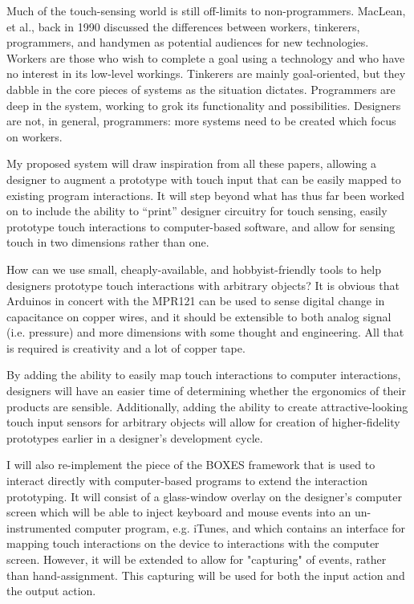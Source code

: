 \documentclass[11pt]{article}
\begin{document}
Much of the touch-sensing world is still off-limits to non-programmers.  MacLean, et al., \cite{USER-TAILORABLE} back in 1990 discussed the differences between workers, tinkerers, programmers, and handymen as potential audiences for new technologies.  Workers are those who wish to complete a goal using a technology and who have no interest in its low-level workings.  Tinkerers are mainly goal-oriented, but they dabble in the core pieces of systems as the situation dictates.  Programmers are deep in the system, working to grok its functionality and possibilities.  Designers are not, in general, programmers: more systems need to be created which focus on workers.

My proposed system will draw inspiration from all these papers, allowing a designer to augment a prototype with touch input that can be easily mapped to existing program interactions. It will step beyond what has thus far been worked on to include the ability to “print” designer circuitry for touch sensing, easily prototype touch interactions to computer-based software, and allow for sensing touch in two dimensions rather than one.

How can we use small, cheaply-available, and hobbyist-friendly tools to help designers prototype touch interactions with arbitrary objects? It is obvious that Arduinos in concert with the MPR121 can be used to sense digital change in capacitance on copper wires, and it should be extensible to both analog signal (i.e. pressure) and more dimensions with some thought and engineering. All that is required is creativity and a lot of copper tape.

By adding the ability to easily map touch interactions to computer interactions, designers will have an easier time of determining whether the ergonomics of their products are sensible. Additionally, adding the ability to create attractive-looking touch input sensors for arbitrary objects will allow for creation of higher-fidelity prototypes earlier in a designer’s development cycle.

I will also re-implement the piece of the BOXES framework that is used to interact directly with computer-based programs to extend the interaction prototyping. It will consist of a glass-window overlay on the designer’s computer screen which will be able to inject keyboard and mouse events into an un-instrumented computer program, e.g. iTunes, and which contains an interface for mapping touch interactions on the device to interactions with the computer screen. However, it will be extended to allow for "capturing" of events, rather than hand-assignment. This capturing will be used for both the input action and the output action.
\end{document}
